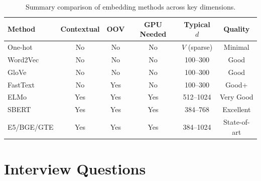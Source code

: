 \begin{table}[H]
\centering
\caption{Summary comparison of embedding methods across key dimensions.}
\label{tab:embedding_comparison}
\begin{tabularx}{\textwidth}{l c c c c c}
\toprule
\textbf{Method} & \textbf{Contextual} & \textbf{OOV} &
\textbf{GPU Needed} & \textbf{Typical $d$} & \textbf{Quality} \\
\midrule
One-hot       & No  & No  & No  & $V$ (sparse)  & Minimal \\
Word2Vec      & No  & No  & No  & 100--300      & Good \\
GloVe         & No  & No  & No  & 100--300      & Good \\
FastText      & No  & Yes & No  & 100--300      & Good+ \\
ELMo          & Yes & Yes & Yes & 512--1024     & Very Good \\
SBERT         & Yes & Yes & Yes & 384--768      & Excellent \\
E5/BGE/GTE    & Yes & Yes & Yes & 384--1024     & State-of-art \\
\bottomrule
\end{tabularx}
\end{table}


\section{Interview Questions}
\label{sec:embedding_interview}

